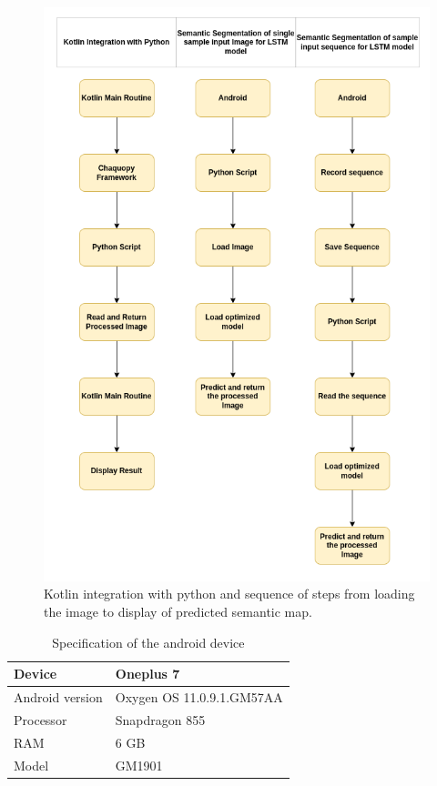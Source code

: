 	\begin{figure}
		\centering
		\includegraphics[width=13cm]{images/android_deployment.png}
		\caption{Kotlin integration with python and sequence of steps from loading the image to display of predicted semantic map.}
		\label{fig:android_pipeline}
	\end{figure}
	
	\begin{table}
	\begin{center}
		\begin{tabular}{ | l | p{3cm} |}
			\hline
			
			Device & Oneplus 7 \\ \hline
			Android version & Oxygen OS 11.0.9.1.GM57AA \\ \hline
			Processor & Snapdragon 855 \\ \hline
			RAM & 6 GB 
			\\ \hline
			Model & GM1901 \\ \hline
			\hline
		\end{tabular}
		\caption{Specification of the android device}
		\label{table:android_spec}
	\end{center}
	\end{table}

